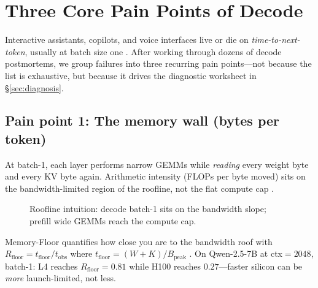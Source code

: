 \section{Three Core Pain Points of Decode}
\label{sec:decode_pain_points}

Interactive assistants, copilots, and voice interfaces live or die on \emph{time-to-next-token}, usually at batch size one \citep{amd2024aie,fan2025ellieenergyefficie}.
After working through dozens of decode postmortems, we group failures into three recurring pain points---not because the list is exhaustive, but because it drives the diagnostic worksheet in \S\ref{sec:diagnosis}.

\subsection{Pain point 1: The memory wall (bytes per token)}
At batch-1, each layer performs narrow GEMMs while \emph{reading} every weight byte and every KV byte again.
Arithmetic intensity (FLOPs per byte moved) sits on the bandwidth-limited region of the roofline, not the flat compute cap \citep{yu2026precisionbottlenec,recasens2025mindthememorygapun,patel2025llminference}.
\begin{figure}[t]
\centering
{}
\caption{Roofline intuition: decode batch-1 sits on the bandwidth slope; prefill wide GEMMs reach the compute cap.}
\label{fig:roofline_decode}
\end{figure}

Memory-Floor quantifies how close you are to the bandwidth roof with $R_{\mathrm{floor}}=t_{\mathrm{floor}}/t_{\mathrm{obs}}$ where $t_{\mathrm{floor}}=(W+K)/B_{\mathrm{peak}}$ \citep{memoryfloor2026}.
On Qwen-2.5-7B at ctx${=}2048$, batch-1: L4 reaches $R_{\mathrm{floor}}{=}0.81$ while H100 reaches $0.27$---faster silicon can be \emph{more} launch-limited, not less.

